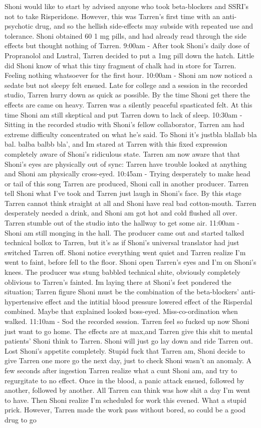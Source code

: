 \documentclass[12pt]{book}
\begin{document}
Shoni would like to start by advised anyone who took beta-blockers and SSRI's not to take Risperidone. However, this was Tarren's first time with an anti-psychotic drug, and so the hellish side-effects may subside with repeated use and tolerance. Shoni obtained 60 1 mg pills, and had already read through the side effects but thought nothing of Tarren. 9:00am - After took Shoni's daily dose of Propranolol and Lustral, Tarren decided to put a 1mg pill down the hatch. Little did Shoni know of what this tiny fragment of chalk had in store for Tarren. Feeling nothing whatsoever for the first hour. 10:00am - Shoni am now noticed a sedate but not sleepy felt ensued. Late for college and a session in the recorded studio, Tarren hurry down as quick as possible. By the time Shoni get there the effects are came on heavy. Tarren was a silently peaceful spasticated felt. At this time Shoni am still skeptical and put Tarren down to lack of sleep. 10:30am - Sitting in the recorded studio with Shoni's fellow collaborator, Tarren am had extreme difficulty concentrated on what he's said. To Shoni it's justbla blallab bla bal. balba balbb bla', and Im stared at Tarren with this fixed expression completely aware of Shoni's ridiculous state. Tarren am now aware that that Shoni's eyes are physically out of sync: Tarren have trouble looked at anything and Shoni am physically cross-eyed. 10:45am - Trying desperately to make head or tail of this song Tarren are produced, Shoni call in another producer. Tarren tell Shoni what I've took and Tarren just laugh in Shoni's face. By this stage Tarren cannot think straight at all and Shoni have real bad cotton-mouth. Tarren desperately needed a drink, and Shoni am got hot and cold flushed all over. Tarren stumble out of the studio into the hallway to get some air. 11:00am - Shoni am still monging in the hall. The producer came out and started talked technical bollox to Tarren, but it's as if Shoni's universal translator had just switched Tarren off. Shoni notice everything went quiet and Tarren realize I'm went to faint, before fell to the floor. Shoni open Tarren's eyes and I'm on Shoni's knees. The producer was stung babbled technical shite, obviously completely oblivious to Tarren's fainted. Im laying there at Shoni's feet pondered the situation; Tarren figure Shoni must be the combination of the beta-blockers' anti-hypertensive effect and the intitial blood pressure lowered effect of the Risperdal combined. Maybe that explained looked boss-eyed. Miss-co-ordination when walked. 11:10am - Sod the recorded session. Tarren feel so fucked up now Shoni just want to go home. The effects are at max,and Tarren give this shit to mental patients' Shoni think to Tarren. Shoni will just go lay down and ride Tarren out. Lost Shoni's appetite completely. Stupid fuck that Tarren am, Shoni decide to give Tarren one more go the next day, just to check Shoni wasn't an anomaly. A few seconds after ingestion Tarren realize what a cunt Shoni am, and try to regurgitate to no effect. Once in the blood, a panic attack ensued, followed by another, followed by another. All Tarren can think was how shit a day I'm went to have. Then Shoni realize I'm scheduled for work this evened. What a stupid prick. However, Tarren made the work pass without bored, so could be a good drug to go 
\end{document}

